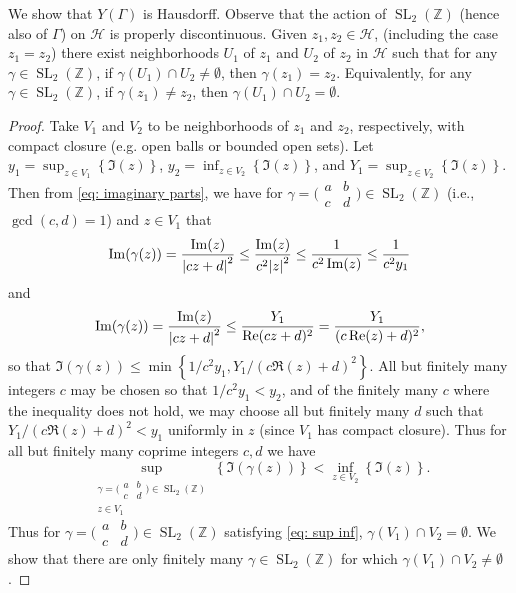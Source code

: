 \documentclass[10pt,leqno]{article}
\theoremstyle{plain}
\theoremstyle{definition}
\numberwithin{equation}{section}
\numberwithin{lem}{section}
\newcommand{\cbr}[1]{\left\{#1\right\}}
\DeclareMathOperator{\SL}{SL}
\begin{document}
We show that $Y(\varGamma)$ is Hausdorff. Observe that the action of $\SL_2(\mathbb{Z})$ (hence also of $\varGamma$) on $\mathcal H$ is properly discontinuous. Given $z_1,z_2\in \mathcal H$, (including the case $z_1 = z_2$) there exist neighborhoods $U_1$ of $z_1$ and $U_2$ of $z_2$ in $\mathcal H$ such that for any $\gamma\in \SL_2(\mathbb{Z})$, if $\gamma(U_1)\cap U_2\neq \emptyset$, then $\gamma(z_1) = z_2$. Equivalently, for any $\gamma\in\SL_2(\mathbb{Z})$, if $\gamma(z_1)\neq z_2$, then $\gamma(U_1)\cap U_2= \emptyset$.
\begin{proof}
    Take $V_1$ and $V_2$ to be neighborhoods of $z_1$ and $z_2$, respectively, with compact closure (e.g. open balls or bounded open sets). Let $y_1 = \sup_{z\in V_1}\cbr{\Im(z)}$, $y_2 = \inf_{z\in V_2}\cbr{\Im(z)}$, and $Y_1 = \sup_{z\in V_2}\cbr{\Im(z)}$. Then from \cref{eq: imaginary parts}, we have for $\gamma = \big(\!\begin{smallmatrix}
        a & b \\ c & d
    \end{smallmatrix}\!\big)\in \SL_2(\mathbb{Z})$ (i.e., $\gcd(c,d) = 1$) and $z\in V_1$ that \[\Im(\gamma(z)) = \frac{\Im(z)}{\abs{cz+d}^2}\leq \frac{\Im(z)}{c^2\abs{z}^2}\leq \frac{1}{c^2\Im(z)}\leq \frac{1}{c^2y_1}\] and \[\Im(\gamma(z)) = \frac{\Im(z)}{\abs{cz+d}^2}\leq \frac{Y_1}{\Re(cz+d)^2} = \frac{Y_1}{(c\Re(z)+d)^2},\] so that $\Im(\gamma(z))\leq\min\cbr{1/c^2y_1,Y_1/(c\Re(z)+d)^2}$. All but finitely many integers $c$ may be chosen so that $1/c^2y_1< y_2$, and of the finitely many $c$ where the inequality does not hold, we may choose all but finitely many $d$ such that $Y_1/(c\Re(z)+d)^2< y_1$ uniformly in $z$ (since $V_1$ has compact closure). Thus for all but finitely many coprime integers $c,d$ we have \begin{equation}\label{eq: sup inf}
        \sup_{\substack{\gamma  = \big(\!\begin{smallmatrix}
            a & b \\ c & d
        \end{smallmatrix}\!\big)\in \SL_2(\mathbb{Z})\\z\in V_1}}\cbr{\Im(\gamma(z))}< \inf_{z\in V_2}\cbr{\Im(z)}.
    \end{equation} Thus for $\gamma = \big(\!\begin{smallmatrix}
        a & b \\ c & d
    \end{smallmatrix}\!\big)\in \SL_2(\mathbb{Z})$ satisfying \cref{eq: sup inf}, $\gamma(V_1)\cap V_2=\emptyset$. We show that there are only finitely many $\gamma\in \SL_2(\mathbb{Z})$ for which $\gamma(V_1)\cap V_2\neq\emptyset$.


\end{proof}
\end{document}
